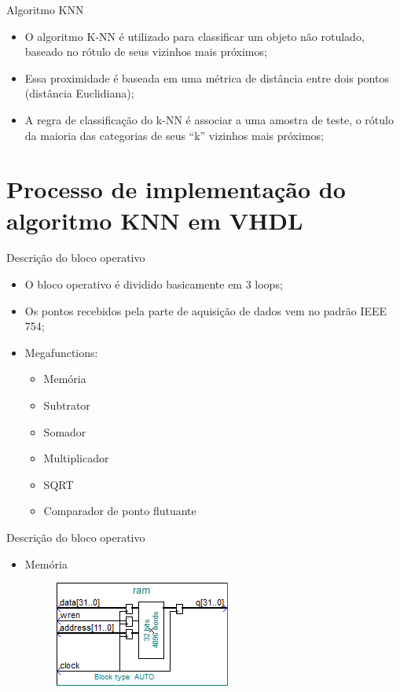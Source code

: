 \documentclass[11pt]{beamer}
\begin{document}
\begin{frame}{Algoritmo KNN}

\begin{itemize}
	\item O algoritmo K-NN é utilizado para classificar um objeto não rotulado,
	baseado no rótulo de seus vizinhos mais próximos;
	\item Essa proximidade é baseada em uma métrica de distância entre dois
	pontos (distância Euclidiana);
	\item A regra de classificação do k-NN é associar a uma amostra de teste, o
	rótulo da maioria das categorias de seus “k” vizinhos mais próximos;
\end{itemize}

\end{frame}


\section{Processo de implementação do algoritmo KNN em VHDL}

\begin{frame}{Descrição do bloco operativo}
	\begin{itemize}
	\item O bloco operativo é dividido basicamente em 3 loops;
	\item Os pontos recebidos pela parte de aquisição de dados vem no padrão
	IEEE 754;
	\item Megafunctions:
		\begin{itemize}
		\item Memória
		\item Subtrator
		\item Somador
		\item Multiplicador
		\item SQRT
		\item Comparador de ponto flutuante
		\end{itemize}
	\end{itemize}
\end{frame}

\begin{frame}{Descrição do bloco operativo}
	\begin{itemize}
	\item Memória
	\begin{figure}[ht]
	\centering
	\includegraphics[width=.5\textwidth]{ram}
	\label{fig:ram}
	\end{figure}
	\end{itemize}
\end{frame}
\end{document}
